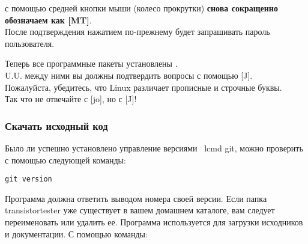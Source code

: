 с помощью средней кнопки мыши (колесо прокрутки) \textbf {снова сокращенно обозначаем как [MT]}.\\
После подтверждения нажатием   по-прежнему будет запрашивать пароль пользователя.

Теперь все программные пакеты установлены . \\
U.U. между ними вы должны подтвердить вопросы с помощью [J].
\\ Пожалуйста, убедитесь, что Linux различает прописные и строчные буквы.
\\ Так что не отвечайте с [jo], но с [J]!
\subsubsection{Скачать исходный код}
Было ли успешно установлено управление версиями \ lcmd {git},
можно проверить с помощью следующей команды: 
\begin{large} \vspace{-0.4em} \begin{verbatim}
git version
\end{verbatim} \end{large}
Программа  должна ответить выводом номера своей версии.
Если папка transistortester уже существует в вашем домашнем каталоге,
вам следует переименовать или удалить ее.
Программа  используется для загрузки исходников и документации.
С помощью команды:

